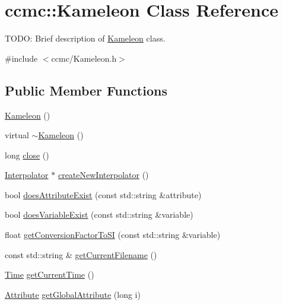 \hypertarget{classccmc_1_1_kameleon}{\section{ccmc\-:\-:Kameleon Class Reference}
\label{classccmc_1_1_kameleon}
}


T\-O\-D\-O\-: Brief description of \hyperlink{classccmc_1_1_kameleon}{Kameleon} class.  




{\ttfamily \#include $<$ccmc/\-Kameleon.\-h$>$}

\subsection*{Public Member Functions}
\begin{DoxyCompactItemize}
\item 
\hyperlink{classccmc_1_1_kameleon_a47ad54f81ad7a5e0a3fb99fe9590afa8}{Kameleon} ()
\item 
virtual \hyperlink{classccmc_1_1_kameleon_a79031ab3a45094967b9fed9d4b38517a}{$\sim$\-Kameleon} ()
\item 
long \hyperlink{classccmc_1_1_kameleon_a165e1d86285b532793e62536854ad3d8}{close} ()
\item 
\hyperlink{classccmc_1_1_interpolator}{Interpolator} $\ast$ \hyperlink{classccmc_1_1_kameleon_a59797b1c1c5c224436d8fb25b9c665b4}{create\-New\-Interpolator} ()
\item 
bool \hyperlink{classccmc_1_1_kameleon_abdbeddc69b5755f1f3aa190dc7cd5a01}{does\-Attribute\-Exist} (const std\-::string \&attribute)
\item 
bool \hyperlink{classccmc_1_1_kameleon_a35324f91c44d7ae59fc6b6a6cd22a651}{does\-Variable\-Exist} (const std\-::string \&variable)
\item 
float \hyperlink{classccmc_1_1_kameleon_a4a23c46a5f162497af00997cb8d8dc7d}{get\-Conversion\-Factor\-To\-S\-I} (const std\-::string \&variable)
\item 
const std\-::string \& \hyperlink{classccmc_1_1_kameleon_a8fe34887cd17afb86fd238b1493b27a2}{get\-Current\-Filename} ()
\item 
\hyperlink{classccmc_1_1_time}{Time} \hyperlink{classccmc_1_1_kameleon_aec2617c0095baf398baa3d7b34f1b22d}{get\-Current\-Time} ()
\item 
\hyperlink{classccmc_1_1_attribute}{Attribute} \hyperlink{classccmc_1_1_kameleon_adf890005ebbc3da5330ddaf598cf837d}{get\-Global\-Attribute} (long i)
\item 

\end{DoxyCompactItemize}

